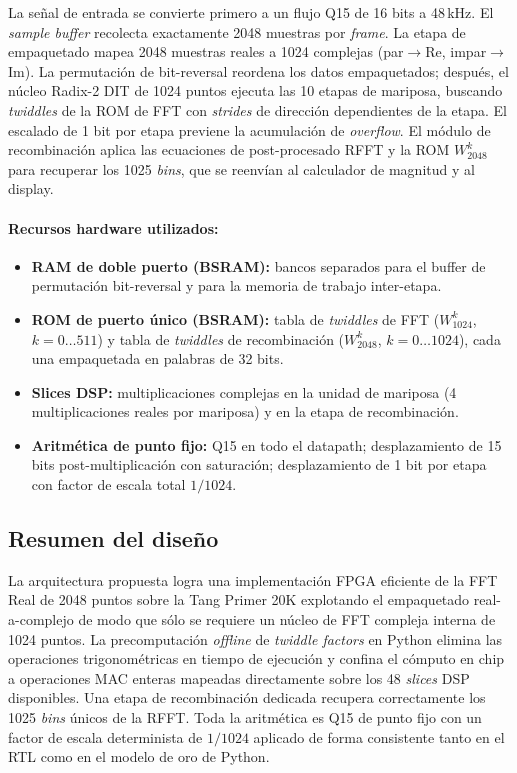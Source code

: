 \documentclass[11pt,a4paper]{article}
\begin{document}
La señal de entrada se convierte primero a un flujo Q15 de 16 bits a 48\,kHz. El
\emph{sample buffer} recolecta exactamente 2048 muestras por \emph{frame}. La
etapa de empaquetado mapea 2048 muestras reales a 1024 complejas (par$\to$Re,
impar$\to$Im). La permutación de bit-reversal reordena los datos empaquetados;
después, el núcleo Radix-2 DIT de 1024 puntos ejecuta las 10 etapas de mariposa,
buscando \emph{twiddles} de la ROM de FFT con \emph{strides} de dirección
dependientes de la etapa. El escalado de 1 bit por etapa previene la acumulación
de \emph{overflow}. El módulo de recombinación aplica las ecuaciones de
post-procesado RFFT y la ROM $W_{2048}^{k}$ para recuperar los 1025 \emph{bins},
que se reenvían al calculador de magnitud y al display.

\paragraph{Recursos hardware utilizados:}
\begin{itemize}[leftmargin=1.4em]
  \item \textbf{RAM de doble puerto (BSRAM):} bancos separados para el buffer de
        permutación bit-reversal y para la memoria de trabajo inter-etapa.
  \item \textbf{ROM de puerto único (BSRAM):} tabla de \emph{twiddles} de FFT
        ($W_{1024}^{k}$, $k=0\dots511$) y tabla de \emph{twiddles} de
        recombinación ($W_{2048}^{k}$, $k=0\dots1024$), cada una empaquetada en
        palabras de 32 bits.
  \item \textbf{Slices DSP:} multiplicaciones complejas en la unidad de mariposa
        (4 multiplicaciones reales por mariposa) y en la etapa de recombinación.
  \item \textbf{Aritmética de punto fijo:} Q15 en todo el datapath;
        desplazamiento de 15 bits post-multiplicación con saturación;
        desplazamiento de 1 bit por etapa con factor de escala total $1/1024$.
\end{itemize}

\subsection{Resumen del diseño}
La arquitectura propuesta logra una implementación FPGA eficiente de la FFT Real
de 2048 puntos sobre la Tang Primer 20K explotando el empaquetado real-a-complejo
de modo que sólo se requiere un núcleo de FFT compleja interna de 1024 puntos. La
precomputación \emph{offline} de \emph{twiddle factors} en Python elimina las
operaciones trigonométricas en tiempo de ejecución y confina el cómputo en chip
a operaciones MAC enteras mapeadas directamente sobre los 48 \emph{slices} DSP
disponibles. Una etapa de recombinación dedicada recupera correctamente los 1025
\emph{bins} únicos de la RFFT. Toda la aritmética es Q15 de punto fijo con un
factor de escala determinista de $1/1024$ aplicado de forma consistente tanto en
el RTL como en el modelo de oro de Python.
\end{document}
